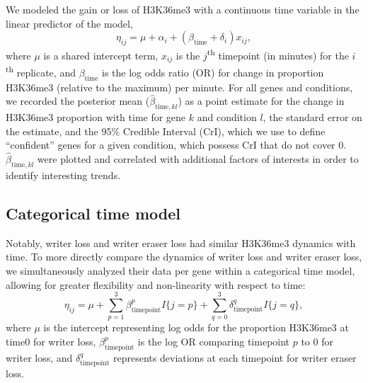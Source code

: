\documentclass[12pt]{extarticle}
\begin{document}
We modeled the gain or loss of H3K36me3 with a continuous time variable in the linear predictor of the model, 
\begin{equation}
	\eta_{ij} = \mu + \alpha_{i} + (\beta_{\text{time}} + \delta_{i})x_{ij},
\end{equation}
where $\mu$ is a shared intercept term, $x_{ij}$ is the $j$\textsuperscript{th} timepoint (in minutes) for the $i$\textsuperscript{th} replicate, and $\beta_{\text{time}}$ is the log odds ratio (OR) for change in proportion H3K36me3 (relative to the maximum) per minute. For all genes and conditions, we recorded the posterior mean ($\widehat{\beta}_{\text{time}, kl}$) as a point estimate for the change in H3K36me3 proportion with time for gene $k$ and condition $l$, the standard error on the estimate, and the 95\% Credible Interval (CrI), which we use to define ``confident'' genes for a given condition, which possess CrI that do not cover 0. $\widehat{\beta}_{\text{time}, kl}$ were plotted and correlated with additional factors of interests in order to identify interesting trends.

\subsection*{Categorical time model}

Notably, writer loss and writer eraser loss had similar H3K36me3 dynamics with time. To more directly compare the dynamics of writer loss and writer eraser loss, we simultaneously analyzed their data per gene within a categorical time model, allowing for greater flexibility and non-linearity with respect to time:
\begin{equation}
	\eta_{ij} = \mu + \sum_{p = 1}^{3}\beta_{\text{timepoint}}^{p}I\{j = p\} + \sum_{q = 0}^{3}\delta_{\text{timepoint}}^{q}I\{j = q\},
\end{equation}
where $\mu$ is the intercept representing log odds for the proportion H3K36me3 at time0 for writer loss, $\beta_{\text{timepoint}}^{p}$ is the log OR comparing timepoint $p$ to $0$ for writer loss, and $\delta_{\text{timepoint}}^{q}$ represents deviations at each timepoint for writer eraser loss.



\end{document}
